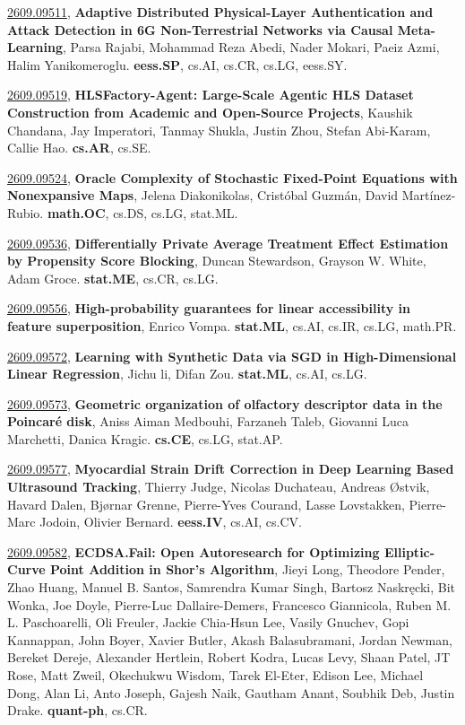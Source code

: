 \documentclass[9pt, a4paper]{article}
\theoremstyle{plain}
\theoremstyle{definition}
\theoremstyle{remark}
\newcommand{\arxivwithtarget}[3]{\hypertarget{#1}{}\href{https://arxiv.org/abs/#1}{#1}, \textbf{\textcolor{arxivblue}{#2}}, #3. }
\begin{document}
\arxivwithtarget{2609.09511}{Adaptive Distributed Physical-Layer Authentication and Attack Detection in 6G Non-Terrestrial Networks via Causal Meta-Learning}{Parsa Rajabi, Mohammad Reza Abedi, Nader Mokari, Paeiz Azmi, Halim Yanikomeroglu}\textbf{eess.SP}, cs.AI, cs.CR, cs.LG, eess.SY.



\arxivwithtarget{2609.09519}{HLSFactory-Agent: Large-Scale Agentic HLS Dataset Construction from Academic and Open-Source Projects}{Kaushik Chandana, Jay Imperatori, Tanmay Shukla, Justin Zhou, Stefan Abi-Karam, Callie Hao}\textbf{cs.AR}, cs.SE.



\arxivwithtarget{2609.09524}{Oracle Complexity of Stochastic Fixed-Point Equations with Nonexpansive Maps}{Jelena Diakonikolas, Cristóbal Guzmán, David Martínez-Rubio}\textbf{math.OC}, cs.DS, cs.LG, stat.ML.



\arxivwithtarget{2609.09536}{Differentially Private Average Treatment Effect Estimation by Propensity Score Blocking}{Duncan Stewardson, Grayson W. White, Adam Groce}\textbf{stat.ME}, cs.CR, cs.LG.



\arxivwithtarget{2609.09556}{High-probability guarantees for linear accessibility in feature superposition}{Enrico Vompa}\textbf{stat.ML}, cs.AI, cs.IR, cs.LG, math.PR.



\arxivwithtarget{2609.09572}{Learning with Synthetic Data via SGD in High-Dimensional Linear Regression}{Jichu li, Difan Zou}\textbf{stat.ML}, cs.AI, cs.LG.



\arxivwithtarget{2609.09573}{Geometric organization of olfactory descriptor data in the Poincaré disk}{Aniss Aiman Medbouhi, Farzaneh Taleb, Giovanni Luca Marchetti, Danica Kragic}\textbf{cs.CE}, cs.LG, stat.AP.



\arxivwithtarget{2609.09577}{Myocardial Strain Drift Correction in Deep Learning Based Ultrasound Tracking}{Thierry Judge, Nicolas Duchateau, Andreas Østvik, Havard Dalen, Bjørnar Grenne, Pierre-Yves Courand, Lasse Lovstakken, Pierre-Marc Jodoin, Olivier Bernard}\textbf{eess.IV}, cs.AI, cs.CV.



\arxivwithtarget{2609.09582}{ECDSA.Fail: Open Autoresearch for Optimizing Elliptic-Curve Point Addition in Shor's Algorithm}{Jieyi Long, Theodore Pender, Zhao Huang, Manuel B. Santos, Samrendra Kumar Singh, Bartosz Naskręcki, Bit Wonka, Joe Doyle, Pierre-Luc Dallaire-Demers, Francesco Giannicola, Ruben M. L. Paschoarelli, Oli Freuler, Jackie Chia-Hsun Lee, Vasily Gnuchev, Gopi Kannappan, John Boyer, Xavier Butler, Akash Balasubramani, Jordan Newman, Bereket Dereje, Alexander Hertlein, Robert Kodra, Lucas Levy, Shaan Patel, JT Rose, Matt Zweil, Okechukwu Wisdom, Tarek El-Eter, Edison Lee, Michael Dong, Alan Li, Anto Joseph, Gajesh Naik, Gautham Anant, Soubhik Deb, Justin Drake}\textbf{quant-ph}, cs.CR.
\end{document}
